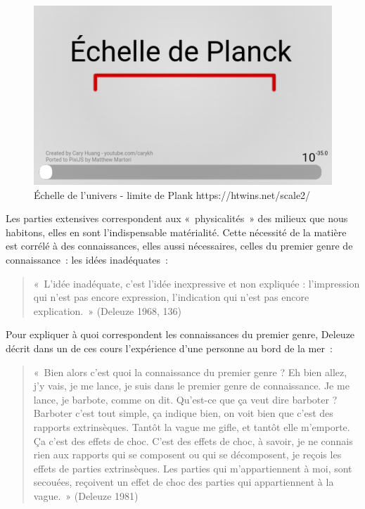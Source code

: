 \documentclass[
  letterpaper,
  DIV=11,
  numbers=noendperiod]{scrreprt}
\begin{document}
\begin{figure}

{\centering \includegraphics{media/100000010000030F000001D7889CE02FB9E347F3.png}

}

\caption{\label{fig-echelleUniversPlank}Échelle de l'univers - limite de
Plank https://htwins.net/scale2/}

\end{figure}

Les parties extensives correspondent aux «~physicalités~» des milieux
que nous habitons, elles en sont l'indispensable matérialité. Cette
nécessité de la matière est corrélé à des connaissances, elles aussi
nécessaires, celles du premier genre de connaissance~: les idées
inadéquates~:

\begin{quote}
«~L'idée inadéquate, c'est l'idée inexpressive et non expliquée :
l'impression qui n'est pas encore expression, l'indication qui n'est pas
encore explication.~» (Deleuze 1968, 136)
\end{quote}

Pour expliquer à quoi correspondent les connaissances du premier genre,
Deleuze décrit dans un de ces cours l'expérience d'une personne au bord
de la mer~:

\begin{quote}
«~Bien alors c'est quoi la connaissance du premier genre ? Eh bien
allez, j'y vais, je me lance, je suis dans le premier genre de
connaissance. Je me lance, je barbote, comme on dit. Qu'est-ce que ça
veut dire barboter ? Barboter c'est tout simple, ça indique bien, on
voit bien que c'est des rapports extrinsèques. Tantôt la vague me gifle,
et tantôt elle m'emporte. Ça c'est des effets de choc. C'est des effets
de choc, à savoir, je ne connais rien aux rapports qui se composent ou
qui se décomposent, je reçois les effets de parties extrinsèques. Les
parties qui m'appartiennent à moi, sont secouées, reçoivent un effet de
choc des parties qui appartiennent à la vague.~» (Deleuze 1981)
\end{quote}
\end{document}
